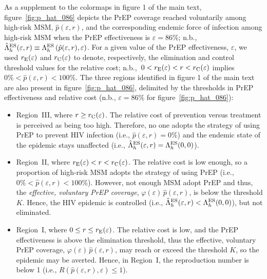 \documentclass[12pt]{article}
\begin{document}
As a supplement to the colormaps in figure 1 of the main text, figure~\ref{fig:p_hat_086} depicts the PrEP coverage reached voluntarily among high-risk MSM, $\hat{p}(\varepsilon,r)$, and the corresponding endemic force of infection among high-risk MSM when the PrEP effectiveness is $\varepsilon=86\%$; n.b., $\hat{\Lambda}_h^{\rm ES}(\varepsilon,r) \equiv \Lambda_h^{\rm ES}\left(\hat{p}(\varepsilon,r),\varepsilon\right)$. For a given value of the PrEP effectiveness, $\varepsilon$, we used $r_{\rm E}(\varepsilon)$ and $r_{\rm C}(\varepsilon)$ to denote, respectively, the elimination and control threshold values for the relative cost; n.b.,~$ 0 < r_{\rm E}(\varepsilon) < r < r_{\rm C}(\varepsilon)$ implies $0\%<\hat{p}(\varepsilon,r)<100\%$. The three regions identified in figure 1 of the main text are also present in figure~\ref{fig:p_hat_086}, delimited by the thresholds in PrEP effectiveness and relative cost (n.b., $\varepsilon=86\%$ for figure~\ref{fig:p_hat_086}):

\begin{itemize}
\item Region~III, where $r \geq r_{\rm C}(\varepsilon)$. The relative cost of prevention versus treatment is perceived as being too high. Therefore, no one adopts the strategy of using PrEP to prevent HIV infection (i.e., $\hat{p}(\varepsilon,r)=0\%$) and the endemic state of the epidemic stays unaffected (i.e., $\hat{\Lambda}_h^{\rm ES}(\varepsilon,r) = \Lambda_h^{\rm ES}(0,0)$). 

\item Region~II, where $r_{\rm E}(\varepsilon) < r < r_{\rm C}(\varepsilon)$. The relative cost is low enough, so a proportion of high-risk MSM adopts the strategy of using PrEP (i.e., $0 \%< \hat{p}(\varepsilon,r) <100\%$). However, not enough MSM adopt PrEP and thus, the {\it effective, voluntary PrEP coverage}, $\varphi(\varepsilon) \, \hat{p}(\varepsilon,r)$, is below the threshold $K$. Hence, the HIV epidemic is controlled (i.e., $\hat{\Lambda}_h^{\rm ES}(\varepsilon,r) < \Lambda_h^{\rm ES}(0,0)$), but not eliminated. 

\item Region~I, where $0 \leq r\leq r_{\rm E}(\varepsilon)$. The relative cost is low, and the PrEP effectiveness is above the elimination threshold, thus the effective, voluntary PrEP coverage, $\varphi(\varepsilon) \, \hat{p}(\varepsilon,r)$, may reach or exceed the threshold $K$, so the epidemic may be averted. Hence, in Region~I, the reproduction number is below 1 (i.e., $R\left(\hat{p}(\varepsilon,r),\varepsilon\right) \leq 1$).
 \end{itemize}
 
\end{document}
